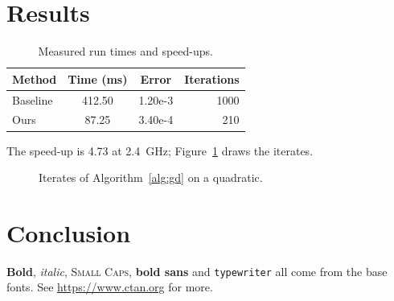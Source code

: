 \documentclass[11pt,a4paper]{article}
\begin{document}
\section{Results}
\begin{table}[ht]
\centering
\caption{Measured run times and speed-ups.}\label{tab:results}
\begin{tabular}{l S[table-format=3.2] S[table-format=1.2e1] r}
\toprule
Method & {Time (\si{\milli\second})} & {Error} & Iterations \\
\midrule
Baseline & 412.50 & 1.20e-3 & 1000 \\
Ours     &  87.25 & 3.40e-4 &  210 \\
\bottomrule
\end{tabular}
\end{table}
The speed-up is \num{4.73} at \SI{2.4}{\giga\hertz}; Figure~\ref{fig:pic}
draws the iterates.

\begin{figure}[ht]
\centering
{}
\caption{Iterates of Algorithm~\ref{alg:gd} on a quadratic.}\label{fig:pic}
\end{figure}

\section{Conclusion}
\textbf{Bold}, \textit{italic}, \textsc{Small Caps}, \textsf{\textbf{bold
sans}} and \texttt{typewriter} all come from the base fonts. See
\url{https://www.ctan.org} for more.



\printindex
\end{document}
